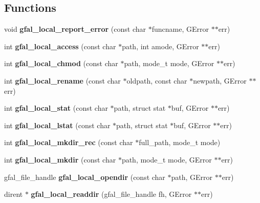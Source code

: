 \subsection*{Functions}
\begin{CompactItemize}
\item 
void \textbf{gfal\_\-local\_\-report\_\-error} (const char $\ast$funcname, GError $\ast$$\ast$err)\label{gfal__posix__local__file_8c_2de9f8c077a2d44c1f4c1656ac5a20fc}

\item 
int \textbf{gfal\_\-local\_\-access} (const char $\ast$path, int amode, GError $\ast$$\ast$err)\label{gfal__posix__local__file_8c_a98ca73fb3083a78f5d85b1f298a8b97}

\item 
int \textbf{gfal\_\-local\_\-chmod} (const char $\ast$path, mode\_\-t mode, GError $\ast$$\ast$err)\label{gfal__posix__local__file_8c_d6c6d5590083bbcef4833f8186a629f3}

\item 
int \textbf{gfal\_\-local\_\-rename} (const char $\ast$oldpath, const char $\ast$newpath, GError $\ast$$\ast$err)\label{gfal__posix__local__file_8c_360b4701633deaae52f9f77c94173405}

\item 
int \textbf{gfal\_\-local\_\-stat} (const char $\ast$path, struct stat $\ast$buf, GError $\ast$$\ast$err)\label{gfal__posix__local__file_8c_dc96268400be1d41613ab796237c1cb8}

\item 
int \textbf{gfal\_\-local\_\-lstat} (const char $\ast$path, struct stat $\ast$buf, GError $\ast$$\ast$err)\label{gfal__posix__local__file_8c_5ad87b117d838e861e51a0999307cc71}

\item 
int \textbf{gfal\_\-local\_\-mkdir\_\-rec} (const char $\ast$full\_\-path, mode\_\-t mode)\label{gfal__posix__local__file_8c_4cb0dd1292a24921b9f693a836dc5771}

\item 
int \textbf{gfal\_\-local\_\-mkdir} (const char $\ast$path, mode\_\-t mode, GError $\ast$$\ast$err)\label{gfal__posix__local__file_8c_29c13ce3294eab970124d188fab1c567}

\item 
gfal\_\-file\_\-handle \textbf{gfal\_\-local\_\-opendir} (const char $\ast$path, GError $\ast$$\ast$err)\label{gfal__posix__local__file_8c_56dc809549c9ff1f7f245619fae1dea5}

\item 
dirent $\ast$ \textbf{gfal\_\-local\_\-readdir} (gfal\_\-file\_\-handle fh, GError $\ast$$\ast$err)\label{gfal__posix__local__file_8c_62b4c61d92b03111251803bc1f0a56b5}


\end{CompactItemize}
